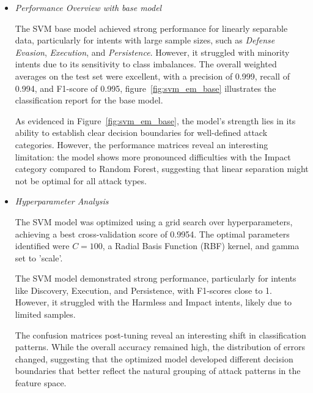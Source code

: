             \begin{itemize}
        
                \item \textit{Performance Overview with base model}
                
                    \vspace{0.3em}

                    The SVM base model achieved strong performance for linearly separable data, particularly for intents with large sample sizes, such as \textit{Defense Evasion}, \textit{Execution}, and \textit{Persistence}. However, it struggled with minority intents due to its sensitivity to class imbalances. The overall weighted averages on the test set were excellent, with a precision of 0.999, recall of 0.994, and F1-score of 0.995, figure~\ref{fig:svm_em_base} illustrates the classification report for the base model.
                    
                    As evidenced in Figure~\ref{fig:svm_em_base}, the model's strength lies in its ability to establish clear decision boundaries for well-defined attack categories. However, the performance matrices reveal an interesting limitation: the model shows more pronounced difficulties with the Impact category compared to Random Forest, suggesting that linear separation might not be optimal for all attack types.
                    
                \vspace{0.5em}

                \item \textit{Hyperparameter Analysis}
                
                    \vspace{0.3em}
                    
                    The SVM model was optimized using a grid search over hyperparameters, achieving a best cross-validation score of 0.9954. The optimal parameters identified were \( C = 100 \), a Radial Basis Function (RBF) kernel, and gamma set to 'scale'.

                    The SVM model demonstrated strong performance, particularly for intents like Discovery, Execution, and Persistence, with F1-scores close to 1. However, it struggled with the Harmless and Impact intents, likely due to limited samples.
            
                    The confusion matrices post-tuning reveal an interesting shift in classification patterns. While the overall accuracy remained high, the distribution of errors changed, suggesting that the optimized model developed different decision boundaries that better reflect the natural grouping of attack patterns in the feature space.
                    

\end{itemize}
